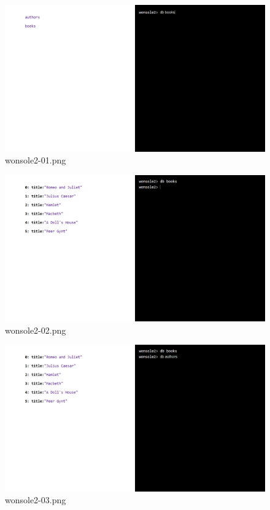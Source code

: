 \centering
\begin{figure}
\includegraphics[width=\textwidth]{screenshot/wonsole2/wonsole2-01.png}
\caption{wonsole2-01.png}
\label{wonsole2-01.png}
\end{figure}


\begin{figure}
\includegraphics[width=\textwidth]{screenshot/wonsole2/wonsole2-02.png}
\caption{wonsole2-02.png}
\label{wonsole2-02.png}
\end{figure}


\clearpage
\begin{figure}
\includegraphics[width=\textwidth]{screenshot/wonsole2/wonsole2-03.png}
\caption{wonsole2-03.png}
\label{wonsole2-03.png}
\end{figure}



